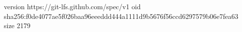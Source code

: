 version https://git-lfs.github.com/spec/v1
oid sha256:f0de4077ae5f026baa96eeeddd444a1111d9b5676f56ccd6297579b06e7fea63
size 2179
